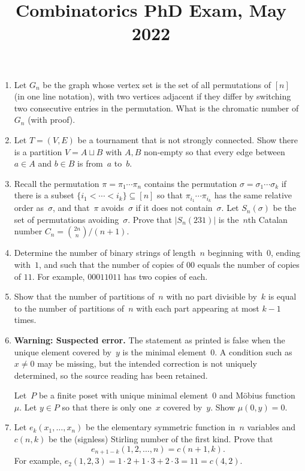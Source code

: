 \documentclass[11pt,letterpaper]{article}
\title{Combinatorics PhD Exam, May 2022}
\author{}
\date{}
\newenvironment{problemconcern}{%
  \par\tagstructbegin{tag=Aside}\begingroup\color{ProblemConcern}
}{%
  \par\endgroup\tagstructend\nopagebreak[4]\vspace{0.12em}
}
\newenvironment{examproblems}[2]{%
  \def\ProblemHeadingTag{#2}%
  \AssignTaggingSocketPlug{block/list/label}{examproblem}%
  \begin{enumerate}%
  \setcounter{enumi}{#1}%
  \renewcommand{\labelenumi}{\textbf{\theenumi.}}%
  \setlength{\topsep}{0.35em}%
  \setlength{\partopsep}{0pt}%
  \setlength{\itemsep}{0.48em}%
  \setlength{\parsep}{0.18em}%
}{\end{enumerate}}
\begin{document}
\maketitle
\thispagestyle{empty}
\begin{examproblems}{0}{H2}
\def\ProblemHeadingText{Problem 1.}
\item
Let \(G_n\) be the graph whose vertex set is the set of all permutations of \([n]\) (in one line notation), with two vertices adjacent if they differ by switching two consecutive entries in the permutation. What is the chromatic number of \(G_n\) (with proof).
\def\ProblemHeadingText{Problem 2.}
\item
Let \(T=(V,E)\) be a tournament that is not strongly connected. Show there is a partition \(V=A\sqcup B\) with \(A,B\) non-empty so that every edge between \(a\in A\) and \(b\in B\) is from~\(a\) to~\(b\).
\def\ProblemHeadingText{Problem 3.}
\item
Recall the permutation \(\pi=\pi_1\cdots\pi_n\) contains the permutation \(\sigma=\sigma_1\cdots\sigma_k\) if there is a subset \(\{i_1<\cdots<i_k\}\subseteq[n]\) so that \(\pi_{i_1}\cdots\pi_{i_k}\) has the same relative order as~\(\sigma\), and that~\(\pi\) avoids~\(\sigma\) if it does not contain~\(\sigma\). Let \(S_n(\sigma)\) be the set of permutations avoiding~\(\sigma\). Prove that \(\lvert S_n(231)\rvert\) is the~\(n\)th Catalan number \(C_n=\binom{2n}{n}/(n+1)\).
\def\ProblemHeadingText{Problem 4.}
\item
Determine the number of binary strings of length~\(n\) beginning with~\(0\), ending with~\(1\), and such that the number of copies of \(00\) equals the number of copies of \(11\). For example, \(00011011\) has two copies of each.
\def\ProblemHeadingText{Problem 5.}
\item
Show that the number of partitions of~\(n\) with no part divisible by~\(k\) is equal to the number of partitions of~\(n\) with each part appearing at most \(k-1\) times.
\def\ProblemHeadingText{Problem 6.}
\item
\begin{problemconcern}
\textbf{Warning: Suspected error.} The statement as printed is false when the unique element covered by~\(y\) is the minimal element~\(0\). A condition such as \(x\ne0\) may be missing, but the intended correction is not uniquely determined, so the source reading has been retained.
\end{problemconcern}
Let~\(P\) be a finite poset with unique minimal element~\(0\) and Möbius function~\(\mu\). Let \(y\in P\) so that there is only one~\(x\) covered by~\(y\). Show \(\mu(0,y)=0\).
\def\ProblemHeadingText{Problem 7.}
\item
Let \(e_k(x_1,\ldots,x_n)\) be the elementary symmetric function in~\(n\) variables and \(c(n,k)\) be the (signless) Stirling number of the first kind. Prove that
\[
e_{n+1-k}(1,2,\ldots,n)=c(n+1,k).
\]
 For example, \(e_2(1,2,3)=1\cdot2+1\cdot3+2\cdot3=11=c(4,2)\).


\end{examproblems}
\end{document}
